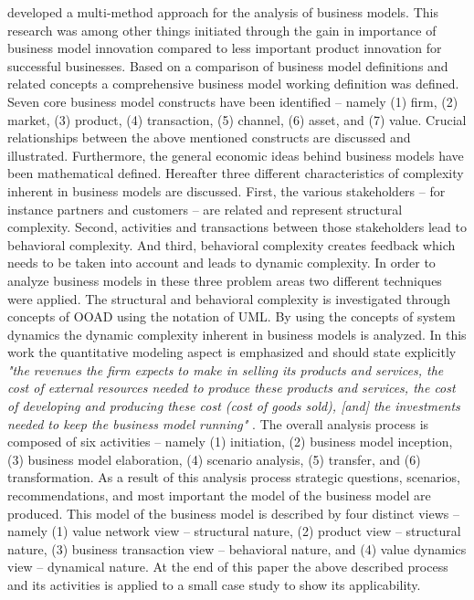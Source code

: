 \citet{Grasl2008} developed a multi-method approach for the analysis of business models. This research was among other things initiated through the gain in importance of business model innovation compared to less important product innovation for successful businesses. Based on a comparison of business model definitions and related concepts a comprehensive business model working definition was defined. Seven core business model constructs have been identified -- namely (1) firm, (2) market, (3) product, (4) transaction, (5) channel, (6) asset, and (7) value. Crucial relationships between the above mentioned constructs are discussed and illustrated. Furthermore, the general economic ideas behind business models have been mathematical defined. Hereafter three different characteristics of complexity inherent in business models are discussed. First, the various stakeholders -- for instance partners and customers -- are related and represent structural complexity. Second, activities and transactions between those stakeholders lead to behavioral complexity. And third, behavioral complexity creates feedback which needs to be taken into account and leads to dynamic complexity. In order to analyze business models in these three problem areas two different techniques were applied. The structural and behavioral complexity is investigated through concepts of \ac{OOAD} using the notation of \ac{UML}. By using the concepts of system dynamics the dynamic complexity inherent in business models is analyzed. In this work the quantitative modeling aspect is emphasized and should state explicitly \textit{"the revenues the firm expects to make in selling its products and services, the cost of external resources needed to produce these products and services, the cost of developing and producing these cost (cost of goods sold), [and] the investments needed to keep the business model running"} \citep[p. 10]{Grasl2008}. The overall analysis process is composed of six activities -- namely (1) initiation, (2) business model inception, (3) business model elaboration, (4) scenario analysis, (5) transfer, and (6) transformation. As a result of this analysis process strategic questions, scenarios, recommendations, and most important the model of the business model are produced. This model of the business model is described by four distinct views -- namely (1) value network view -- structural nature, (2) product view -- structural nature, (3) business transaction view -- behavioral nature, and (4) value dynamics view -- dynamical nature. At the end of this paper the above described process and its activities is applied to a small case study to show its applicability.

